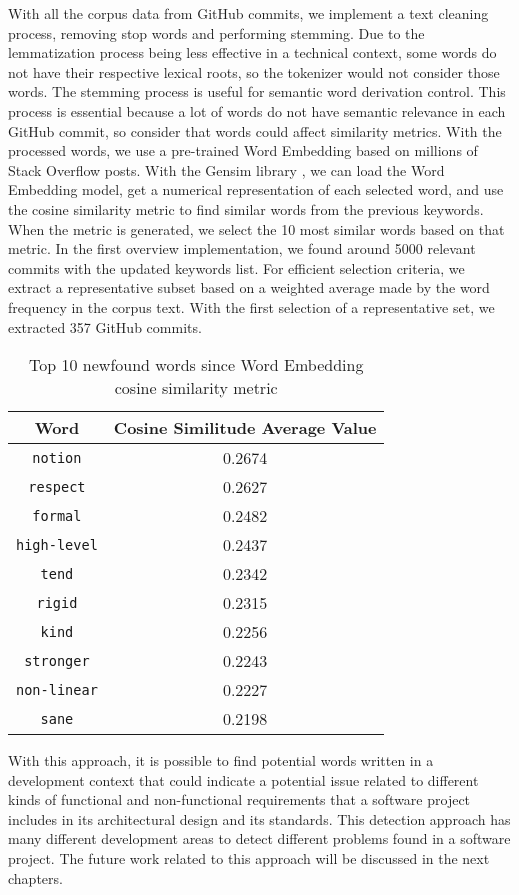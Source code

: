 With all the corpus data from GitHub commits, we implement a text cleaning process, removing stop words and performing stemming. Due to the lemmatization process being less effective in a technical context, some words do not have their respective lexical roots, so the tokenizer would not consider those words. The stemming process is useful for semantic word derivation control. This process is essential because a lot of words do not have semantic relevance in each GitHub commit, so consider that words could affect similarity metrics. With the processed words, we use a pre-trained Word Embedding based on millions of Stack Overflow posts. With the Gensim library \citet{gensim}, we can load the Word Embedding model, get a numerical representation of each selected word, and use the cosine similarity metric to find similar words from the previous keywords. When the metric is generated, we select the 10 most similar words based on that metric.
In the first overview implementation, we found around 5000 relevant commits with the updated keywords list. For efficient selection criteria, we extract a representative subset based on a weighted average made by the word frequency in the corpus text. With the first selection of a representative set, we extracted 357 GitHub commits. 


\begin{table}[H]
    \centering
    \begin{tabular}{|c|c|}
    \hline
       Word  & Cosine Similitude Average Value \\
       \hline
        \texttt{notion} & 0.2674 \\
        \hline
        \texttt{respect} & 0.2627 \\
        \hline
        \texttt{formal} & 0.2482 \\
        \hline
        \texttt{high-level} & 0.2437 \\
        \hline
        \texttt{tend} & 0.2342 \\
        \hline
        \texttt{rigid} & 0.2315 \\
        \hline
        \texttt{kind} & 0.2256 \\
        \hline
        \texttt{stronger} & 0.2243 \\
        \hline
        \texttt{non-linear} & 0.2227 \\
        \hline
        \texttt{sane} & 0.2198 \\
        \hline
    \end{tabular}
    \caption{Top 10 newfound words since Word Embedding cosine similarity metric}
    \label{tab:my_label}
\end{table}

With this approach, it is possible to find potential words written in a development context that could indicate a potential issue related to different kinds of functional and non-functional requirements that a software project includes in its architectural design and its standards. This detection approach has many different development areas to detect different problems found in a software project. The future work related to this approach will be discussed in the next chapters.
\endinput